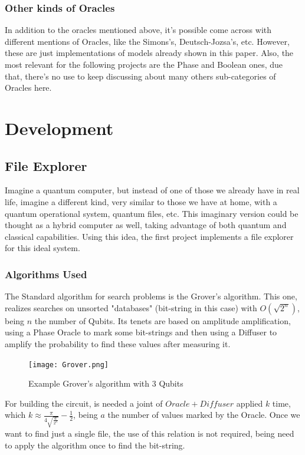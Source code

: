 \documentclass{article}
\makeatletter
\renewcommand\subsubsubsection{\@startsection{paragraph}{4}{\z@}{-2.5ex\@plus -1ex \@minus -.25ex}{1.25ex \@plus .25ex}{\normalfont\normalsize\bfseries}}
\makeatother
\begin{document}
\subsubsection{Other kinds of Oracles}
In addition to the oracles mentioned above, it's possible come across with different mentions of Oracles, like the Simons's, Deutsch-Jozsa's, etc. However, these are just implementations of models already shown in this paper. Also, the most relevant for the following projects are the Phase and Boolean ones, due that, there's no use to keep discussing about many others sub-categories of Oracles here.

\section{Development}


\subsection{File Explorer} \label{file-explorer}
Imagine a quantum computer, but instead of one of those we already have in real life, imagine a different kind, very similar to those we have at home, with a quantum operational system, quantum files, etc. This imaginary version could be thought as a hybrid computer as well, taking advantage of both quantum and classical capabilities. Using this idea, the first project implements a file explorer for this ideal system.

\newpage

\subsubsection{Algorithms Used}

\subsubsubsection{Grover}
The Standard algorithm for search problems is the Grover's algorithm. This one, realizes searches on unsorted "databases" (bit-string in this case) with $O(\sqrt{2^n})$, being $n$ the number of Qubits. Its tenets are based on amplitude amplification, using a Phase Oracle to mark some bit-strings and then using a Diffuser to amplify the probability to find these values after measuring it.

\begin{figure}[h]
	\centering
	\texttt{[image: Grover.png]}
	\caption{Example Grover's algorithm with $3$ Qubits}
	\label{fig:grover-default-circuit}
\end{figure}

For building the circuit, is needed a joint of $Oracle + Diffuser$ applied $k$ time, which $k \approx { {\frac{\pi}{4 \sqrt{\frac{a}{2^n}}}} - {\frac{1}{2}}  }$, being $a$ the number of values marked by the Oracle. Once we want to find just a single file, the use of this relation is not required, being need to apply the algorithm once to find the bit-string.
\end{document}
